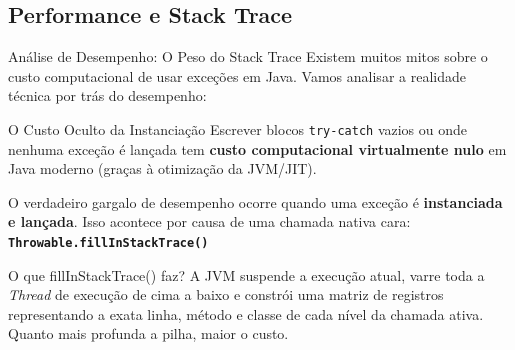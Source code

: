 \documentclass[9pt]{beamer}
\begin{document}
\subsection{Performance e Stack Trace}
\begin{frame}{Análise de Desempenho: O Peso do Stack Trace}
    Existem muitos mitos sobre o custo computacional de usar exceções em Java. Vamos analisar a realidade técnica por trás do desempenho:
    
    \vspace{0.2cm}
    
    \begin{block}{O Custo Oculto da Instanciação}
        Escrever blocos \texttt{try-catch} vazios ou onde nenhuma exceção é lançada tem \textbf{custo computacional virtualmente nulo} em Java moderno (graças à otimização da JVM/JIT).
        
        \vspace{0.15cm}
        O verdadeiro gargalo de desempenho ocorre quando uma exceção é \textbf{instanciada e lançada}. Isso acontece por causa de uma chamada nativa cara:
        \centering\small\color{red!80!black}\bfseries
        \texttt{Throwable.fillInStackTrace()}
    \end{block}
    
    \begin{block}{O que fillInStackTrace() faz?}
        A JVM suspende a execução atual, varre toda a \textit{Thread} de execução de cima a baixo e constrói uma matriz de registros representando a exata linha, método e classe de cada nível da chamada ativa. Quanto mais profunda a pilha, maior o custo.
    \end{block}
\end{frame}
\end{document}
